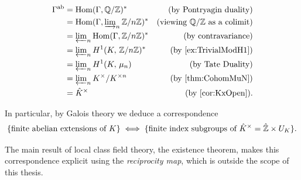\documentclass[a4paper, oneside]{memoir}
\begin{document}
\begin{align*}
    \Gamma^{\text{ab}} & = \operatorname{Hom}(\Gamma, \mathbb{Q}/\mathbb{Z})^*                              & \text{(by Pontryagin duality)}        \\
                       & = \operatorname{Hom}(\Gamma, \varinjlim_n\nolimits \mathbb{Z}/n\mathbb{Z})^*          & \text{(viewing $\mathbb{Q}/\mathbb{Z}$ as a colimit)} \\
                       & = \varprojlim_n\nolimits \operatorname{Hom}(\Gamma, \mathbb{Z}/n\mathbb{Z})^*         & \text{(by contravariance)}            \\
                       & = \varprojlim_n\nolimits H^{1}( K, \, \mathbb{Z}/n\mathbb{Z} )^*             & \text{(by \ref{ex:TrivialModH1})}     \\
                       & = \varprojlim_n\nolimits H^{1}( K, \, \mu_n )             & \text{(by Tate Duality)}              \\
                       & = \varprojlim_n\nolimits K^{\times} / K^{\times n} & \text{(by \ref{thm:CohomMuN})}        \\
                       & = \hat{K}^{\times}                                  & \text{(by \ref{cor:KxOpen})}.
\end{align*}

In particular, by Galois theory we deduce a correspondence
\[
    \{\text{finite abelian extensions of }K\} \iff \{\text{finite index subgroups of }\hat{K}^{\times} = \hat{\mathbb{Z}} \times U_K\}
    .\]

The main result of local class field theory, the existence theorem, makes this correspondence explicit using the \textit{reciprocity map}, which is outside the scope of this thesis.

\nocite{*}
\printbibliography
\end{document}
